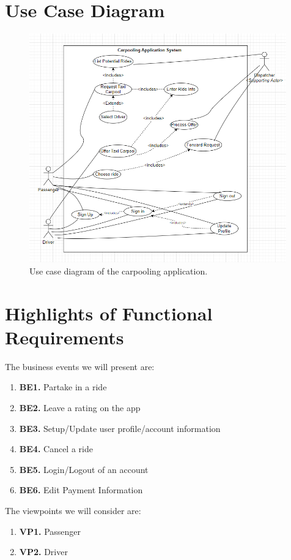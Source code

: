 \documentclass[]{article}
\begin{document}
\newpage\section{Use Case Diagram}
\label{sec:use_case_diagram}
\begin{figure}[h]
	\centering
	\includegraphics[width=30em]{usecase_v2.png}
	\caption{Use case diagram of the carpooling application.}
	\label{fig:usecase}
\end{figure}

\section{Highlights of Functional Requirements}
\label{sec:functional_requirements}
The business events we will present are:
\begin{enumerate}
    \item[] \textbf{BE1.} Partake in a ride
    \item[] \textbf{BE2.} Leave a rating on the app
    \item[] \textbf{BE3.} Setup/Update user profile/account information
    \item[] \textbf{BE4.} Cancel a ride
    \item[] \textbf{BE5.} Login/Logout of an account
    \item[] \textbf{BE6.} Edit Payment Information
\end{enumerate}

The viewpoints we will consider are:
\begin{enumerate}
    \item[] \textbf{VP1.} Passenger
    \item[] \textbf{VP2.} Driver
\end{enumerate}
\end{document}
